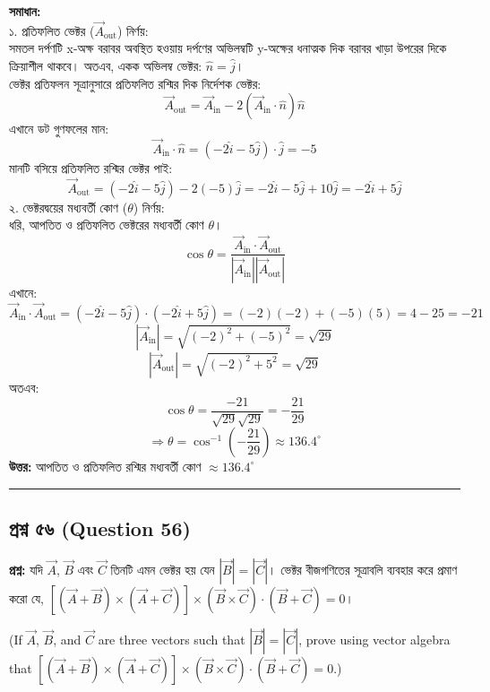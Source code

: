 \documentclass[12pt]{article}
\begin{document}
\textbf{সমাধান:} \\
১. প্রতিফলিত ভেক্টর ($\vec{A}_{\text{out}}$) নির্ণয়: \\
সমতল দর্পণটি x-অক্ষ বরাবর অবস্থিত হওয়ায় দর্পণের অভিলম্বটি y-অক্ষের ধনাত্মক দিক বরাবর খাড়া উপরের দিকে ক্রিয়াশীল থাকবে। অতএব, একক অভিলম্ব ভেক্টর: $\hat{n} = \hat{j}$। \\
ভেক্টর প্রতিফলন সূত্রানুসারে প্রতিফলিত রশ্মির দিক নির্দেশক ভেক্টর:
$$\vec{A}_{\text{out}} = \vec{A}_{\text{in}} - 2(\vec{A}_{\text{in}} \cdot \hat{n})\hat{n}$$
এখানে ডট গুণফলের মান:
$$\vec{A}_{\text{in}} \cdot \hat{n} = (-2\hat{i} - 5\hat{j}) \cdot \hat{j} = -5$$
মানটি বসিয়ে প্রতিফলিত রশ্মির ভেক্টর পাই:
$$\vec{A}_{\text{out}} = (-2\hat{i} - 5\hat{j}) - 2(-5)\hat{j} = -2\hat{i} - 5\hat{j} + 10\hat{j} = -2\hat{i} + 5\hat{j}$$
২. ভেক্টরদ্বয়ের মধ্যবর্তী কোণ ($\theta$) নির্ণয়: \\
ধরি, আপতিত ও প্রতিফলিত ভেক্টরের মধ্যবর্তী কোণ $\theta$।
$$\cos\theta = \frac{\vec{A}_{\text{in}} \cdot \vec{A}_{\text{out}}}{|\vec{A}_{\text{in}}| |\vec{A}_{\text{out}}|}$$
এখানে:
$$\vec{A}_{\text{in}} \cdot \vec{A}_{\text{out}} = (-2\hat{i} - 5\hat{j}) \cdot (-2\hat{i} + 5\hat{j}) = (-2)(-2) + (-5)(5) = 4 - 25 = -21$$
$$|\vec{A}_{\text{in}}| = \sqrt{(-2)^2 + (-5)^2} = \sqrt{29}$$
$$|\vec{A}_{\text{out}}| = \sqrt{(-2)^2 + 5^2} = \sqrt{29}$$
অতএব:
$$\cos\theta = \frac{-21}{\sqrt{29}\sqrt{29}} = -\frac{21}{29}$$
$$\Rightarrow \theta = \cos^{-1}\left( -\frac{21}{29} \right) \approx 136.4^\circ$$
\textbf{উত্তর:} আপতিত ও প্রতিফলিত রশ্মির মধ্যবর্তী কোণ $\approx 136.4^\circ$

\vspace{0.8cm}

\noindent\rule{\textwidth}{1pt}
\subsection*{প্রশ্ন ৫৬ (Question 56)}

\textbf{প্রশ্ন:} যদি $\vec{A}$, $\vec{B}$ এবং $\vec{C}$ তিনটি এমন ভেক্টর হয় যেন $|\vec{B}| = |\vec{C}|$। ভেক্টর বীজগণিতের সূত্রাবলি ব্যবহার করে প্রমাণ করো যে, $[(\vec{A}+\vec{B}) \times (\vec{A}+\vec{C})] \times (\vec{B} \times \vec{C}) \cdot (\vec{B}+\vec{C}) = 0$।

(If $\vec{A}$, $\vec{B}$, and $\vec{C}$ are three vectors such that $|\vec{B}| = |\vec{C}|$, prove using vector algebra that $[(\vec{A}+\vec{B}) \times (\vec{A}+\vec{C})] \times (\vec{B} \times \vec{C}) \cdot (\vec{B}+\vec{C}) = 0$.)
\end{document}
